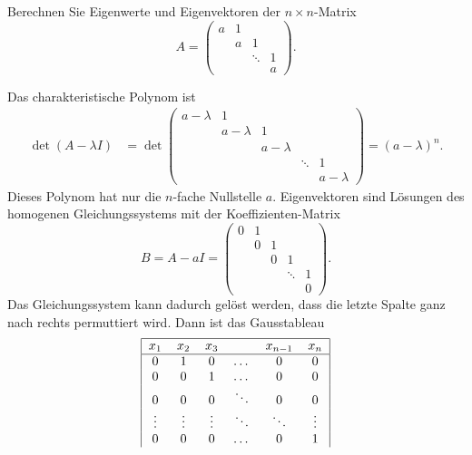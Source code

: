 Berechnen Sie Eigenwerte und Eigenvektoren der $n\times n$-Matrix
\[
A=\begin{pmatrix}
a    &1      &      &      \\
     &      a&     1&      \\
     &       &\ddots&     1\\
     &       &      &     a
\end{pmatrix}.
\]


\begin{loesung}
Das charakteristische Polynom ist
\begin{align*}
\operatorname{det}(A-\lambda I)
&=
\operatorname{det}\begin{pmatrix}
a-\lambda&        1&         &         &         \\
         &a-\lambda&        1&         &         \\
         &         &a-\lambda&         &         \\
         &         &         &\ddots   &        1\\
         &         &         &         &a-\lambda
\end{pmatrix}
=(a-\lambda)^n.
\end{align*}
Dieses Polynom hat nur die $n$-fache Nullstelle $a$.
Eigenvektoren sind Lösungen des homogenen Gleichungssystems
mit der Koeffizienten-Matrix
\[
B=A-aI=\begin{pmatrix}
0&1& &      & \\
 &0&1&      & \\
 & &0&     1& \\
 & & &\ddots&1\\
 & & &      &0
\end{pmatrix}.
\]
Das Gleichungssystem kann dadurch gelöst werden, dass die
letzte Spalte ganz nach rechts permuttiert wird. Dann ist das
Gausstableau
\[
\begin{tabular}{|cccccc|}
\hline
$x_1$&$x_2$&$x_3$&&$x_{n-1}$&$x_n$\\
\hline
0       &1       &0       &$ \dots$&0       &0       \\
0       &0       &1       &$ \dots$&0       &0       \\
0       &0       &0       &$\ddots$&0       &0       \\
$\vdots$&$\vdots$&$\vdots$&$\ddots$&$\ddots$&$\vdots$\\
0       &0       &0       &$ \dots$&0       &1       \\

\end{tabular}\]
\end{loesung}
